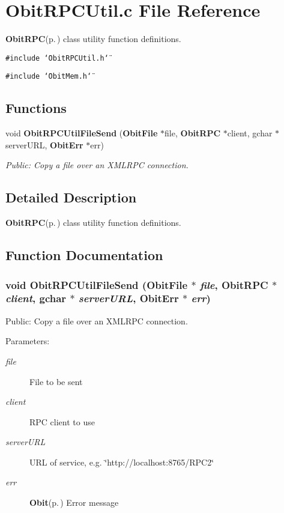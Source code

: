 \section{Obit\-RPCUtil.c File Reference}
\label{ObitRPCUtil_8c}
{\bf Obit\-RPC}{\rm (p.\,\pageref{structObitRPC})} class utility function definitions. 

{\tt \#include \char`\"{}Obit\-RPCUtil.h\char`\"{}}\par
{\tt \#include \char`\"{}Obit\-Mem.h\char`\"{}}\par
\subsection*{Functions}
\begin{CompactItemize}
\item 
void {\bf Obit\-RPCUtil\-File\-Send} ({\bf Obit\-File} $\ast$file, {\bf Obit\-RPC} $\ast$client, gchar $\ast$server\-URL, {\bf Obit\-Err} $\ast$err)
\begin{CompactList}\small\item\em Public: Copy a file over an XMLRPC connection. \item\end{CompactList}\end{CompactItemize}


\subsection{Detailed Description}
{\bf Obit\-RPC}{\rm (p.\,\pageref{structObitRPC})} class utility function definitions. 



\subsection{Function Documentation}
\subsubsection{\setlength{\rightskip}{0pt plus 5cm}void Obit\-RPCUtil\-File\-Send ({\bf Obit\-File} $\ast$ {\em file}, {\bf Obit\-RPC} $\ast$ {\em client}, gchar $\ast$ {\em server\-URL}, {\bf Obit\-Err} $\ast$ {\em err})}\label{ObitRPCUtil_8c_a0}


Public: Copy a file over an XMLRPC connection. 

\begin{Desc}
\item[Parameters:]
\begin{description}
\item[{\em file}]File to be sent \item[{\em client}]RPC client to use \item[{\em server\-URL}]URL of service, e.g. \char`\"{}http://localhost:8765/RPC2\char`\"{} \item[{\em err}]{\bf Obit}{\rm (p.\,\pageref{structObit})} Error message \end{description}
\end{Desc}
